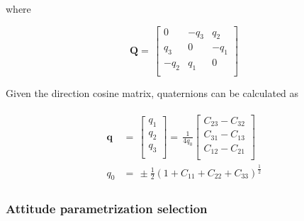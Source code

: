 where

\begin{equation}
\label{eqn:Qmatrix}
\bm{Q}
=\,
\begin{bmatrix}
0 & - q_3 & q_2 \\[0.3em]
q_3 & 0 & - q_1 \\[0.3em]
- q_2 & q_1 & 0\\[0.3em]
\end{bmatrix}
\end{equation}

Given the direction cosine matrix, quaternions can be calculated as

\begin{align}\label{eqn:quat4}
\begin{split}
\bm{q}
& =\,
\begin{bmatrix}
q_1\\[0.3em]
q_2\\[0.3em]
q_3\\[0.3em]
\end{bmatrix}
 =\,
\frac{1}{4q_0}
\begin{bmatrix}
C_{23} - C_{32}\\[0.3em]
C_{31} - C_{13}\\[0.3em]
C_{12} - C_{21}\\[0.3em]
\end{bmatrix}
\\
q_0
& =\,
\pm{\frac{1}{2}}{(1 + C_{11} + C_{22} + C_{33})}^{\frac{1}{2}}
\end{split}
\end{align}

\subsubsection{Attitude parametrization selection}

